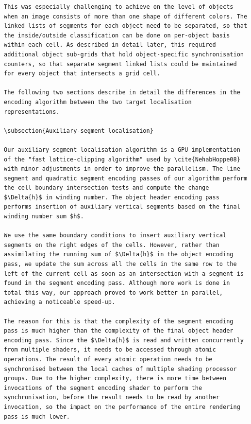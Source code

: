 \documentclass[11pt,a4paper,twoside]{article}
\begin{document}
\begin {verbatim}
This was especially challenging to achieve on the level of objects when an image consists of more than one shape of different colors. The linked lists of segments for each object need to be separated, so that the inside/outside classification can be done on per-object basis within each cell. As described in detail later, this required additional object sub-grids that hold object-specific synchronisation counters, so that separate segment linked lists could be maintained for every object that intersects a grid cell.

The following two sections describe in detail the differences in the encoding algorithm between the two target localisation representations.

\subsection{Auxiliary-segment localisation}

Our auxiliary-segment localisation algorithm is a GPU implementation of the "fast lattice-clipping algorithm" used by \cite{NehabHoppe08} with minor adjustments in order to improve the parallelism. The line segment and quadratic segment encoding passes of our algorithm perform the cell boundary intersection tests and compute the change  $\Delta{h}$ in winding number. The object header encoding pass performs insertion of auxiliary vertical segments based on the final winding number sum $h$.

We use the same boundary conditions to insert auxiliary vertical segments on the right edges of the cells. However, rather than assimilating the running sum of $\Delta{h}$ in the object encoding pass, we update the sum across all the cells in the same row to the left of the current cell as soon as an intersection with a segment is found in the segment encoding pass. Although more work is done in total this way, our approach proved to work better in parallel, achieving a noticeable speed-up.

The reason for this is that the complexity of the segment encoding pass is much higher than the complexity of the final object header encoding pass. Since the $\Delta{h}$ is read and written concurrently from multiple shaders, it needs to be accessed through atomic operations. The result of every atomic operation needs to be synchronised between the local caches of multiple shading processor groups. Due to the higher complexity, there is more time between invocations of the segment encoding shader to perform the synchronisation, before the result needs to be read by another invocation, so the impact on the performance of the entire rendering pass is much lower.


\end{verbatim}
\end{document}

